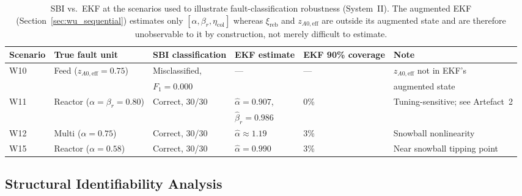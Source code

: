 \documentclass[aps,pre,twocolumn,superscriptaddress,floatfix]{revtex4-2}
\begin{document}
\begin{table}[tbp]
\centering
\caption{SBI vs.\ EKF at the scenarios used to illustrate fault-classification
  robustness (System~II). The augmented EKF
  (Section~\ref{sec:wu_sequential}) estimates only $[\alpha,\beta_r,\eta_\mathrm{col}]$ whereas
  $\xi_\mathrm{reb}$ and $z_{A0,\mathrm{eff}}$ are outside its augmented state and are therefore unobservable to it by construction, not merely difficult to estimate.}
\label{tab:wu_ekf_classification}
\small
\begin{tabular}{llllll}
\toprule
Scenario & True fault unit & SBI classification           & EKF estimate & EKF 90\% coverage & Note \\
\midrule
W10 & Feed ($z_{A0,\mathrm{eff}}=0.75$)  & Misclassified,  & --- & --- & $z_{A0,\mathrm{eff}}$ not in EKF's  \\
    &                                    & $F_1=0.000$ &  & & augmented state \\

W11 & Reactor ($\alpha=\beta_r=0.80$)    & Correct, 30/30 & $\hat\alpha=0.907$,& 0\% & Tuning-sensitive; see Artefact~2 \\
       &                                     & & $\hat\beta_r=0.986$ &  & \\
W12 & Multi ($\alpha=0.75$)              & Correct, 30/30 & $\hat\alpha\approx1.19$ & 3\% & Snowball nonlinearity \\
W15 & Reactor ($\alpha=0.58$)            & Correct, 30/30 & $\hat\alpha=0.990$ & 3\% & Near snowball tipping point \\
\bottomrule
\end{tabular}
\end{table}



\subsection{Structural Identifiability Analysis}
\label{sec:wu_identifiability}
\end{document}
